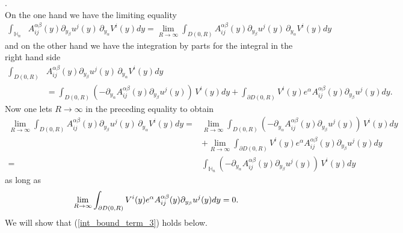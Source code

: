 \documentclass[11pt, reqno]{amsart}
\theoremstyle{definition}
\theoremstyle{remark}
\numberwithin{equation}{section}
\begin{document}
\begin{appendices}
		.\\ 
		On the one hand we have the limiting equality
		\begin{align*}
			\int_{  \mathbb{H}_n}& A^{\alpha\beta}_{ij}(y) \partial_{y_\beta} u^j(y)\, \partial_{y_\alpha}\! V^i(y) dy
		= 	\lim_{R\rightarrow\infty} 	\int_{D(0,R)}  A^{\alpha\beta}_{ij}(y) \partial_{y_\beta} u^j(y)\, \partial_{y_\alpha}\! V^i(y) dy
		\end{align*}and on the other hand we have the integration by parts for the integral in the right hand side
		\begin{align*}
			\int_{D(0,R)}&   A^{\alpha\beta}_{ij}(y) \partial_{y_\beta} u^j(y)\, \partial_{y_\alpha}\! V^i(y)  dy \\ 	&=\int_{ D(0,R) } (- \partial_{y_\alpha}\! A^{\alpha\beta}_{ij}(y) \partial_{y_\beta} u^j(y))\,  V^i(y)  dy  + 	\int_{\partial D(0,R) }   V^i(y)e^\alpha A^{\alpha\beta}_{ij}(y) \partial_{y_\beta} u^j(y) dy .
		\end{align*}
		Now one lets $R \rightarrow\infty$ in the preceding equality to obtain
		\begin{align*}
			\lim_{R\rightarrow\infty}	\int_{  D(0,R) } A^{\alpha\beta}_{ij}(y) \partial_{y_\beta} u^j(y)\, \partial_{y_\alpha}\! V^i(y) dy = &\lim_{R\rightarrow\infty}	\int_{  D(0,R) }   (- \partial_{y_\alpha}\! A^{\alpha\beta}_{ij}(y) \partial_{y_\beta} u^j(y))\,  V^i(y) dy  \\
			& + \lim_{R\rightarrow\infty}	\int_{\partial  D(0,R) }  V^i(y)e^\alpha A^{\alpha\beta}_{ij}(y) \partial_{y_\beta} u^j(y) dy \\
			= &	\int_{   \mathbb{H}_n }  (- \partial_{y_\alpha}\! A^{\alpha\beta}_{ij}(y) \partial_{y_\beta} u^j(y))\,  V^i(y)     dy
		\end{align*}
		as long as
		\begin{equation}\label{int_bound_term_3}
			\lim_{R\rightarrow\infty}	\int_{\partial D(0,R)}  V^i(y)e^\alpha A^{\alpha\beta}_{ij}(y) \partial_{y_\beta} u^j(y)  dy=0.\\\nonumber
		\end{equation}
			We will show that (\ref{int_bound_term_3}) holds below.\\
			

\end{appendices}
\end{document}
